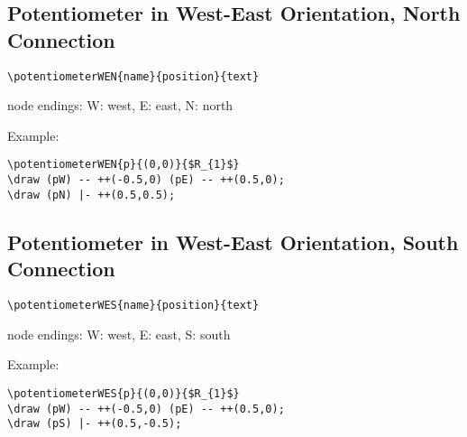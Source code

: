 \documentclass[parskip=full]{scrartcl}
\begin{document}
\subsection{Potentiometer in West-East Orientation, North Connection}

\begin{verbatim}
\potentiometerWEN{name}{position}{text}
\end{verbatim}
node endings: W: west, E: east, N: north

Example:\\
\begin{minipage}{0.8\textwidth}
\begin{verbatim}
\potentiometerWEN{p}{(0,0)}{$R_{1}$}
\draw (pW) -- ++(-0.5,0) (pE) -- ++(0.5,0);
\draw (pN) |- ++(0.5,0.5);
\end{verbatim}
\end{minipage}
\begin{minipage}{0.19\textwidth}
\end{minipage}

\subsection{Potentiometer in West-East Orientation, South Connection}

\begin{verbatim}
\potentiometerWES{name}{position}{text}
\end{verbatim}
node endings: W: west, E: east, S: south

Example:\\
\begin{minipage}{0.8\textwidth}
\begin{verbatim}
\potentiometerWES{p}{(0,0)}{$R_{1}$}
\draw (pW) -- ++(-0.5,0) (pE) -- ++(0.5,0);
\draw (pS) |- ++(0.5,-0.5);
\end{verbatim}
\end{minipage}
\begin{minipage}{0.19\textwidth}
\end{minipage}
\end{document}
